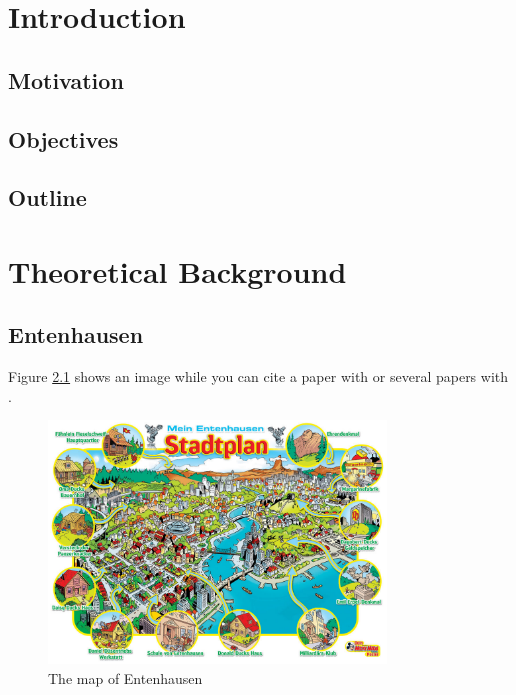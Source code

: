 \documentclass[12pt, a4paper, fleqn]{memoir}%
\begin{document}
\mainmatter

\chapter{Introduction}
\label{chap:Introduction}

\section{Motivation}
\label{sec:Motivation}

\section{Objectives}
\label{sec:Objectives}

\section{Outline}
\label{sec:Outline}

\chapter{Theoretical Background}
\label{chap:TheoreticalBackground}

\section{Entenhausen}
\label{sec:Entenhausen}
Figure \ref{fig:intro} shows an image while you can cite a paper with \cite{AmirPnueli1985} or several papers with \cite{ThomasRist2004, Rist2002}.

\begin{figure}[h]
\centering
\includegraphics[width=0.8\textwidth]{enten.jpg}
\caption{The map of Entenhausen}
\label{fig:intro}
\end{figure}
\end{document}
